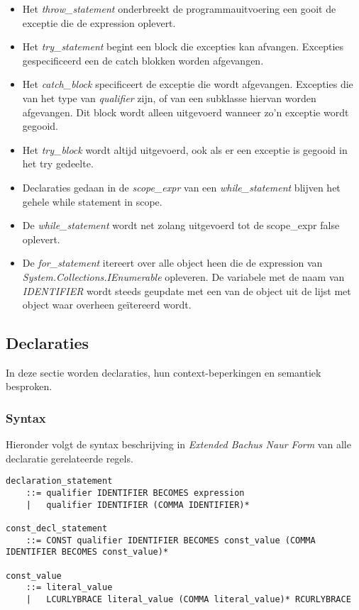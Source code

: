 \begin{itemize}
	\item Het \textit{throw\_statement} onderbreekt de programmauitvoering een gooit de exceptie die de expression oplevert.
	\item Het \textit{try\_statement} begint een block die excepties kan afvangen. Excepties gespecificeerd een de catch blokken worden afgevangen.
	\item Het \textit{catch\_block} specificeert de exceptie die wordt afgevangen. Excepties die van het type van \textit{qualifier} zijn, of van een subklasse hiervan worden afgevangen. Dit block wordt alleen uitgevoerd wanneer zo'n exceptie wordt gegooid.
	\item Het \textit{try\_block} wordt altijd uitgevoerd, ook als er een exceptie is gegooid in het try gedeelte.
	\item Declaraties gedaan in de \textit{scope\_expr} van een \textit{while\_statement} blijven het gehele while statement in scope.
	\item De \textit{while\_statement} wordt net zolang uitgevoerd tot de scope\_expr false oplevert.
	\item De \textit{for\_statement} itereert over alle object heen die de expression van \textit{System.Collections.IEnumerable} opleveren. De variabele met de naam van \textit{IDENTIFIER} wordt steeds geupdate met een van de object uit de lijst met object waar overheen ge\"itereerd wordt.
\end{itemize}

\subsection{Declaraties}
In deze sectie worden declaraties, hun context-beperkingen en semantiek besproken.

\subsubsection{Syntax}
Hieronder volgt de syntax beschrijving in \textit{Extended Bachus Naur Form} van alle declaratie gerelateerde regels.

\begin{lstlisting}
declaration_statement
	::=	qualifier IDENTIFIER BECOMES expression
	|	qualifier IDENTIFIER (COMMA IDENTIFIER)*

const_decl_statement
	::=	CONST qualifier IDENTIFIER BECOMES const_value (COMMA IDENTIFIER BECOMES const_value)*

const_value
	::=	literal_value
	|	LCURLYBRACE literal_value (COMMA literal_value)* RCURLYBRACE
\end{lstlisting}

